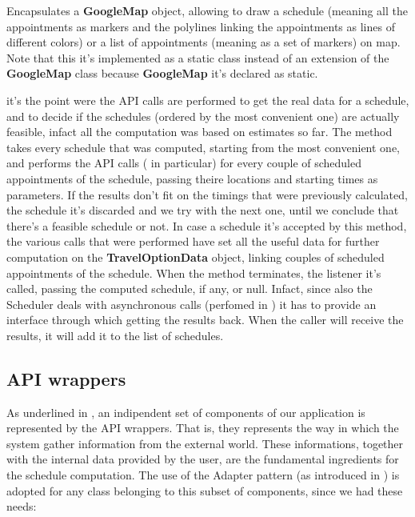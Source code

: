 Encapsulates a \textbf{GoogleMap} object, allowing to draw a schedule (meaning all the appointments as markers and the polylines linking the appointments as lines of different colors) or a list of appointments (meaning as a set of markers) on map. Note that this it's implemented as a static class instead of an extension of the \textbf{GoogleMap} class because \textbf{GoogleMap} it's declared as static.

 it's the point were the API calls are performed to get the real data for a schedule, and to decide if the schedules (ordered by the most convenient one) are actually feasible, infact all the computation was based on estimates so far.
The method takes every schedule that was computed, starting from the most convenient one, and performs the API calls ( in particular) for every couple of scheduled appointments of the schedule, passing theire locations and starting times as parameters. If the results don't fit on the timings that were previously calculated, the schedule it's discarded and we try with the next one, until we conclude that there's a feasible schedule or not.
In case a schedule it's accepted by this method, the various calls that were performed have set all the useful data for further computation on the \textbf{TravelOptionData} object, linking couples of scheduled appointments of the schedule.
When the method terminates, the listener it's called, passing the computed schedule, if any, or null. Infact, since also the Scheduler deals with asynchronous calls (perfomed in ) it has to provide an interface through which getting the results back.
When the caller will receive the results, it will add it to the list of schedules.

\subsection{API wrappers} \label{sect:APIWrappers}
As underlined in , an indipendent set of components of our application is represented by the API wrappers. That is, they represents the way in which the system gather information from the external world. These informations, together with the internal data provided by the user, are the fundamental ingredients for the schedule computation.
The use of the Adapter pattern (as introduced in ) is adopted for any class belonging to this subset of components, since we had these needs:

